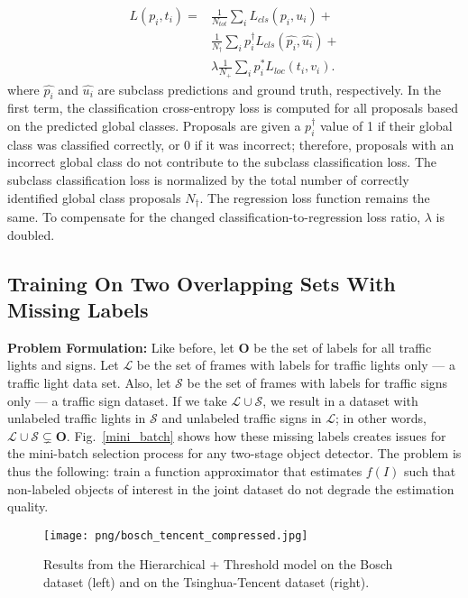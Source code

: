 \documentclass[10pt, conference, compsocconf]{IEEEtran}
\newcommand{\fig}[1]{Fig.~\ref{#1}}
\begin{document}
\begin{equation}
\begin{aligned}
L({p_i},{t_i}) = & \frac{1}{N_{tot}}\sum_{i}L_{cls}(p_{i}, u_{i}) +\\&\frac{1}{N_{\dagger}}\sum_{i}p^{\dagger}_{i}L_{cls}(\hat{p_{i}}, \hat{u_{i}})+\\ &\lambda\frac{1}{N_{+}}\sum_{i} p^*_{i}L_{loc}(t_i,v_i).
\end{aligned}
\end{equation}
where $\hat{p_i}$ and $\hat{u_i}$ are subclass predictions and ground truth, respectively. In the first term, the classification cross-entropy loss is computed for all proposals based on the predicted global classes. Proposals are given a $p^{\dagger}_{i}$ value of 1 if their global class was classified correctly, or 0 if it was incorrect; therefore, proposals with an incorrect global class do not contribute to the subclass classification loss. The subclass classification loss is normalized by the total number of correctly identified global class proposals $N_{\dagger}$. The regression loss function remains the same. To compensate for the changed classification-to-regression loss ratio, $\lambda$ is doubled.

\subsection{Training On Two Overlapping Sets With Missing Labels}
\noindent\textbf{Problem Formulation:} 
Like before, let $\bm{O}$ be the set of labels for all traffic lights and signs. Let $\mathcal{L}$ be the set of frames with labels for traffic lights only --- a traffic light data set. Also, let $\mathcal{S}$ be the set of frames with labels for traffic signs only --- a traffic sign dataset. If we take $\mathcal{L} \cup \mathcal{S}$, we result in a dataset with unlabeled traffic lights in $\mathcal{S}$ and unlabeled traffic signs in $\mathcal{L}$; in other words, $\mathcal{L} \cup \mathcal{S} \subsetneq \bm{O}$. \fig{mini_batch} shows how these missing labels creates issues for the mini-batch selection process for any two-stage object detector. The problem is thus the following: train a function approximator that estimates $f(I)$ such that non-labeled objects of interest in the joint dataset do not degrade the estimation quality. \\

\begin{figure*}[t!]
    \begin{center}
    \texttt{[image: png/bosch\_tencent\_compressed.jpg]}
    \end{center}
    \caption{Results from the Hierarchical + Threshold model on the Bosch dataset (left) and on the Tsinghua-Tencent dataset (right).}
    \label{sample_detection_bosch_tencent}
\end{figure*}
\end{document}
